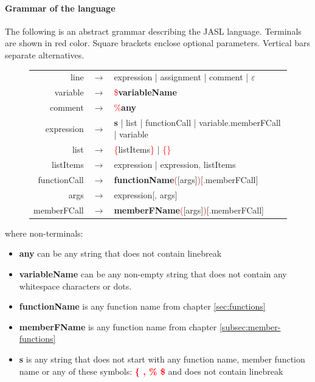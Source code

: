 \documentclass{ctuthesis}
\begin{document}
\paragraph{Grammar of the language} The following is an abstract grammar describing the JASL language. Terminals are shown in red color. Square brackets enclose optional parameters. Vertical bars separate alternatives.

\begin{figure}[H]
\begin{ctucolortab}
\begin{tabular}{rcl}
	line &$\rightarrow$& expression | assignment | comment | $\varepsilon$ \\
	variable &$\rightarrow$& \textcolor{red}{\$}\textbf{variableName}\\
	comment &$\rightarrow$& \textcolor{red}{\%}\textbf{any} \\
	expression &$\rightarrow$& \textbf{s} | list | functionCall | variable\textcolor{red}{.}memberFCall | variable \\
	list &$\rightarrow$& \textcolor{red}{\{}listItems\textcolor{red}{\}} | \textcolor{red}{\{}\textcolor{red}{\}} \\
	listItems &$\rightarrow$& expression | expression\textcolor{red}{,} listItems \\
	functionCall &$\rightarrow$& \textbf{functionName}\textcolor{red}{(}[args]\textcolor{red}{)}[\textcolor{red}{.}memberFCall] \\
	args &$\rightarrow$& expression[\textcolor{red}{,} args] \\
	memberFCall &$\rightarrow$& \textbf{memberFName}\textcolor{red}{(}[args]\textcolor{red}{)}[\textcolor{red}{.}memberFCall]
\end{tabular}
\end{ctucolortab}
\end{figure}

where non-terminals:
\begin{itemize}
	\item \textbf{any} can be any string that does not contain linebreak
	\item \textbf{variableName} can be any non-empty string that does not contain any whitespace characters or dots. 
	\item \textbf{functionName} is any function name from chapter \ref{sec:functions}
	\item \textbf{memberFName} is any function name from chapter \ref{subsec:member-functions}
	\item \textbf{s} is any string that does not start with any function name, member function name or any of these symbols: \textcolor{red}{\textbf{\{ , \% \$}} and does not contain linebreak
\end{itemize}
\end{document}
